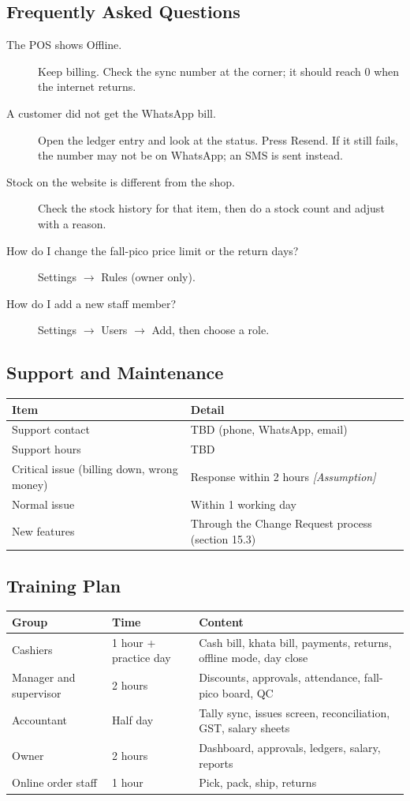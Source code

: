 \documentclass[11pt,a4paper]{article}
\newcommand{\assump}{\textit{[Assumption]}}
\newcommand{\hdr}{\rowcolor{hdrgray}\bfseries}
\begin{document}
\subsection{Frequently Asked Questions}
\begin{description}
\item[The POS shows Offline.] Keep billing. Check the sync number at the corner; it should reach 0 when the internet returns.
\item[A customer did not get the WhatsApp bill.] Open the ledger entry and look at the status. Press Resend. If it still fails, the number may not be on WhatsApp; an SMS is sent instead.
\item[Stock on the website is different from the shop.] Check the stock history for that item, then do a stock count and adjust with a reason.
\item[How do I change the fall-pico price limit or the return days?] Settings $\rightarrow$ Rules (owner only).
\item[How do I add a new staff member?] Settings $\rightarrow$ Users $\rightarrow$ Add, then choose a role.
\end{description}

\subsection{Support and Maintenance}
\begin{longtable}{L{6cm}L{10.5cm}}
\hdr Item & Detail \\ \endhead
Support contact & TBD (phone, WhatsApp, email) \\
Support hours & TBD \\
Critical issue (billing down, wrong money) & Response within 2 hours \assump \\
Normal issue & Within 1 working day \\
New features & Through the Change Request process (section 15.3) \\
\end{longtable}

\subsection{Training Plan}
\begin{longtable}{L{4cm}L{3.6cm}L{8.9cm}}
\hdr Group & Time & Content \\ \endhead
Cashiers & 1 hour + practice day & Cash bill, khata bill, payments, returns, offline mode, day close \\
Manager and supervisor & 2 hours & Discounts, approvals, attendance, fall-pico board, QC \\
Accountant & Half day & Tally sync, issues screen, reconciliation, GST, salary sheets \\
Owner & 2 hours & Dashboard, approvals, ledgers, salary, reports \\
Online order staff & 1 hour & Pick, pack, ship, returns \\
\end{longtable}
\end{document}
